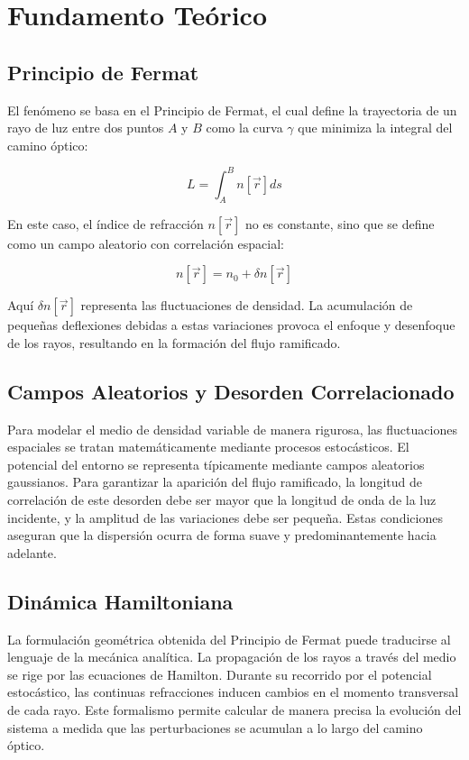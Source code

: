 \chapter{Fundamento Teórico}


\section{Principio de Fermat}
El fenómeno se basa en el Principio de Fermat, el cual define la trayectoria de un rayo de luz entre dos puntos $A$ y $B$ como la curva $\gamma$ que minimiza la integral del camino óptico:

$$L = \int_{A}^{B} n[\vec{r}] ds$$

En este caso, el índice de refracción $n[\vec{r}]$ no es constante, sino que se define como un campo aleatorio con correlación espacial:

$$n[\vec{r}] = n_0 + \delta n[\vec{r}]$$

Aquí $\delta n[\vec{r}]$ representa las fluctuaciones de densidad. La acumulación de pequeñas deflexiones debidas a estas variaciones provoca el enfoque y desenfoque de los rayos, resultando en la formación del flujo ramificado.


\section{Campos Aleatorios y Desorden Correlacionado}
Para modelar el medio de densidad variable de manera rigurosa, las fluctuaciones espaciales se tratan matemáticamente mediante procesos estocásticos. El potencial del entorno se representa típicamente mediante campos aleatorios gaussianos. Para garantizar la aparición del flujo ramificado, la longitud de correlación de este desorden debe ser mayor que la longitud de onda de la luz incidente, y la amplitud de las variaciones debe ser pequeña. Estas condiciones aseguran que la dispersión ocurra de forma suave y predominantemente hacia adelante.

\section{Dinámica Hamiltoniana}
La formulación geométrica obtenida del Principio de Fermat puede traducirse al lenguaje de la mecánica analítica. La propagación de los rayos a través del medio se rige por las ecuaciones de Hamilton. Durante su recorrido por el potencial estocástico, las continuas refracciones inducen cambios en el momento transversal de cada rayo. Este formalismo permite calcular de manera precisa la evolución del sistema a medida que las perturbaciones se acumulan a lo largo del camino óptico.

